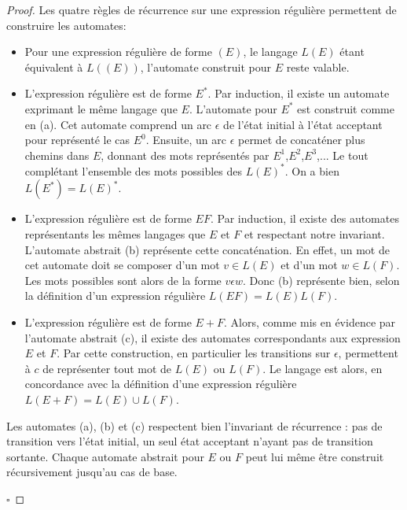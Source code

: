 \begin{proof}
	Les quatre règles de récurrence sur une expression régulière permettent de construire les automates:
	\begin{itemize}
		\item Pour une expression régulière de forme $(E)$, le langage $L(E)$ étant équivalent à $L((E))$, l'automate construit pour $E$ reste valable.
		\item L'expression régulière est de forme $E^*$. Par induction, il existe un automate exprimant le même langage que $E$. L'automate pour $E^*$ est construit comme en (a). Cet automate comprend un arc $\epsilon$ de l'état initial à l'état acceptant pour représenté le cas $E^0$. Ensuite, un arc $\epsilon$ permet de concaténer plus chemins dans $E$, donnant des mots représentés par $E^1$,$E^2$,$E^3$,... Le tout complétant l'ensemble des mots possibles des $L(E)^*$. On a bien $L(E^*)=L(E)^*$.
		\item L'expression régulière est de forme $EF$. Par induction, il existe des automates représentants les mêmes langages que $E$ et $F$ et respectant notre invariant. L'automate abstrait (b) représente cette concaténation. En effet, un mot de cet automate doit se composer d'un mot $v\in L(E)$ et d'un mot $w \in L(F)$. Les mots possibles sont alors de la forme $v\epsilon w$. Donc (b) représente bien, selon la définition d'un expression régulière $L(EF)=L(E)L(F)$.
		\item L'expression régulière est de forme $E+F$. Alors, comme mis en évidence par l'automate abstrait (c), il existe des automates correspondants aux expression $E$ et $F$. Par cette construction, en particulier les transitions sur $\epsilon$, permettent à $c$ de représenter tout mot de $L(E)$ ou $L(F)$. Le langage est alors, en concordance avec la définition d'une expression régulière $L(E+F)=L(E)\cup L(F)$.
	\end{itemize}
	
	Les automates (a), (b) et (c) respectent bien l'invariant de récurrence : pas de transition vers l'état initial, un seul état acceptant n'ayant pas de transition sortante. Chaque automate abstrait pour $E$ ou $F$ peut lui même être construit récursivement jusqu'au cas de base.
	
	\hfill$\square$
\end{proof}
